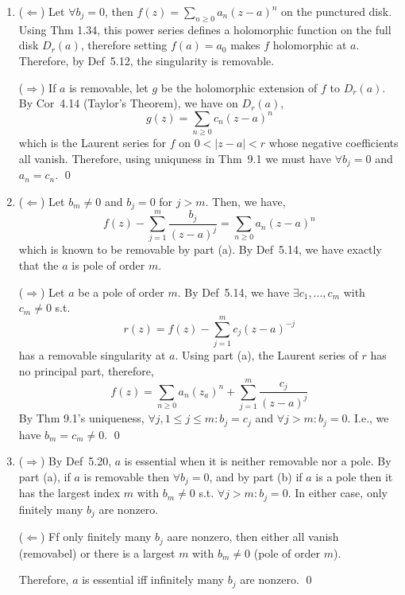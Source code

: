 \documentclass[a4paper]{article}
\begin{document}
\begin{enumerate}
    \item[\textbf{(a)}] ($\Leftarrow$) Let $\forall b_j = 0$, then $f(z) = \sum_{n\ge0}a_n(z-a)^n$ on the punctured disk. Using Thm 1.34, this power series defines a holomorphic function on the full disk $D_r(a)$, therefore setting $f(a) = a_0$ makes $f$ holomorphic at $a$. Therefore, by Def~5.12, the singularity is removable.

    \medskip
    ($\Rightarrow$) If $a$ is removable, let $g$ be the holomorphic extension of $f$ to $D_r(a)$. By Cor~4.14 (Taylor's Theorem), we have on $D_r(a)$,
    \[
    g(z) = \sum_{n\ge0}c_n(z-a)^n
    \]  
    which is the Laurent series for $f$ on $0<|z-a|<r$ whose negative coefficients all vanish. Therefore, using uniquness in Thm~9.1 we must have $\forall b_j = 0$ and $a_n = c_n$. \qed

    \item[\textbf{(b)}] ($\Leftarrow$) Let $b_m \ne 0$ and $b_j = 0$ for $j > m$. Then, we have,
    \[
    f(z) - \sum_{j=1}^m \frac{b_j}{(z-a)^j} = \sum_{n\ge0}a_n(z-a)^n
    \]
    which is known to be removable by part (a). By Def~5.14, we have exactly that the $a$ is pole of order $m$.

    \medskip
    ($\Rightarrow$) Let $a$ be a pole of order $m$. By Def~5.14, we have $\exists c_1, \dots, c_m$ with $c_m \ne 0$ s.t.
    \[
    r(z) = f(z) - \sum_{j=1}^m c_j(z-a)^{-j}
    \]
    has a removable singularity at $a$. Using part (a), the Laurent series of $r$ has no principal part, therefore,
    \[
    f(z) = \sum_{n\ge0} a_n(z_a)^n + \sum_{j=1}^m \frac{c_j}{(z-a)^j}
    \]
    By Thm 9.1's uniqueness, $\forall j, 1 \le j \le m: b_j = c_j$ and $\forall j > m: b_j = 0$. I.e., we have $b_m = c_m \ne 0$. \qed

    \item[\textbf{(c)}] ($\Rightarrow$) By Def~5.20, $a$ is essential when it is neither removable nor a pole. By part (a), if $a$ is removable then $\forall b_j = 0$, and by part (b) if $a$ is a pole then it has the largest index $m$ with $b_m \ne 0$ s.t. $\forall j > m: b_j =0$. In either case, only finitely many $b_j$ are nonzero.

    \medskip
    ($\Leftarrow$) Ff only finitely many $b_j$ aare nonzero, then either all vanish (removabel) or there is a largest $m$ with $b_m \ne 0$ (pole of order $m$). 

    \medskip
    Therefore, $a$ is essential iff infinitely many $b_j$ are nonzero. \qed
\end{enumerate}
\end{document}
